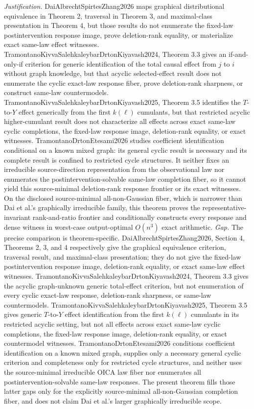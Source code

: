 \documentclass{article}
\begin{document}
\par\smallskip\noindent \textit{Justification.} DaiAlbrechtSpirtesZhang2026 maps graphical distributional equivalence in Theorem 2, traversal in Theorem 3, and maximal-class presentation in Theorem 4, but those results do not enumerate the fixed-law postintervention response image, prove deletion-rank equality, or materialize exact same-law effect witnesses. TramontanoKivvaSalehkaleybarDrtonKiyavash2024, Theorem 3.3 gives an if-and-only-if criterion for generic identification of the total causal effect from \(j\) to \(i\) without graph knowledge, but that acyclic selected-effect result does not enumerate the cyclic exact-law response fiber, prove deletion-rank sharpness, or construct same-law countermodels. TramontanoKivvaSalehkaleybarDrtonKiyavash2025, Theorem 3.5 identifies the \(T\)-to-\(Y\) effect generically from the first \(k(\ell)\) cumulants, but that restricted acyclic higher-cumulant result does not characterize all effects across exact same-law cyclic completions, the fixed-law response image, deletion-rank equality, or exact witnesses. TramontanoDrtonEtesami2026 studies coefficient identification conditional on a known mixed graph: its general cyclic result is necessary and its complete result is confined to restricted cycle structures. It neither fixes an irreducible source-direction representation from the observational law nor enumerates the postintervention-solvable same-law completion fiber, so it cannot yield this source-minimal deletion-rank response frontier or its exact witnesses. On the disclosed source-minimal all-non-Gaussian fiber, which is narrower than Dai et al.'s graphically irreducible family, this theorem proves the representative-invariant rank-and-ratio frontier and conditionally constructs every response and dense witness in worst-case output-optimal \(O(n^3)\) exact arithmetic. \textit{Gap.} The precise comparison is theorem-specific. DaiAlbrechtSpirtesZhang2026, Section 4, Theorems 2, 3, and 4 respectively give the graphical equivalence criterion, traversal result, and maximal-class presentation; they do not give the fixed-law postintervention response image, deletion-rank equality, or exact same-law effect witnesses. TramontanoKivvaSalehkaleybarDrtonKiyavash2024, Theorem 3.3 gives the acyclic graph-unknown generic total-effect criterion, but not enumeration of every cyclic exact-law response, deletion-rank sharpness, or same-law countermodels. TramontanoKivvaSalehkaleybarDrtonKiyavash2025, Theorem 3.5 gives generic \(T\)-to-\(Y\) effect identification from the first \(k(\ell)\) cumulants in its restricted acyclic setting, but not all effects across exact same-law cyclic completions, the fixed-law response image, deletion-rank equality, or exact countermodel witnesses. TramontanoDrtonEtesami2026 conditions coefficient identification on a known mixed graph, supplies only a necessary general cyclic criterion and completeness only for restricted cycle structures, and neither uses the source-minimal irreducible OICA law fiber nor enumerates all postintervention-solvable same-law responses. The present theorem fills those latter gaps only for the explicitly source-minimal all-non-Gaussian completion fiber, and does not claim Dai et al.'s larger graphically irreducible scope. 
\end{document}
